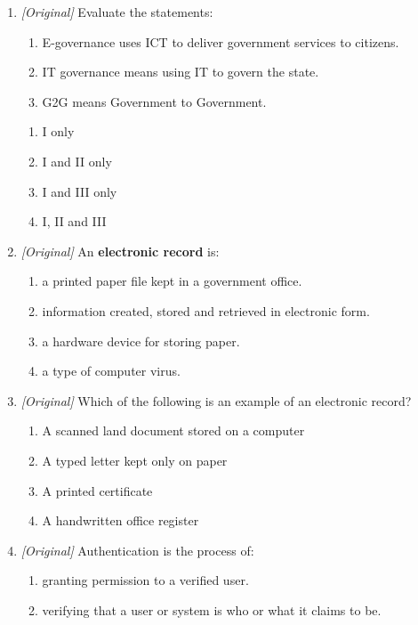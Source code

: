 \begin{enumerate}[label=\textbf{Q\arabic*.}, leftmargin=*]
\begin{enumerate}[label=\Alph*.]
    \item Greater need for citizens to visit offices in person
  \end{enumerate}
\item \textit{[Original]} Evaluate the statements:
  \begin{enumerate}[label=\Roman*.]
    \item E-governance uses ICT to deliver government services to citizens.
    \item IT governance means using IT to govern the state.
    \item G2G means Government to Government.
  \end{enumerate}
  \begin{enumerate}[label=\Alph*.]
    \item I only
    \item I and II only
    \item I and III only
    \item I, II and III
  \end{enumerate}
\item \textit{[Original]} An \textbf{electronic record} is:
  \begin{enumerate}[label=\Alph*.]
    \item a printed paper file kept in a government office.
    \item information created, stored and retrieved in electronic form.
    \item a hardware device for storing paper.
    \item a type of computer virus.
  \end{enumerate}
\item \textit{[Original]} Which of the following is an example of an
  electronic record?
  \begin{enumerate}[label=\Alph*.]
    \item A scanned land document stored on a computer
    \item A typed letter kept only on paper
    \item A printed certificate
    \item A handwritten office register
  \end{enumerate}
\item \textit{[Original]} Authentication is the process of:
  \begin{enumerate}[label=\Alph*.]
    \item granting permission to a verified user.
    \item verifying that a user or system is who or what it claims to be.

\end{enumerate}
\end{enumerate}
